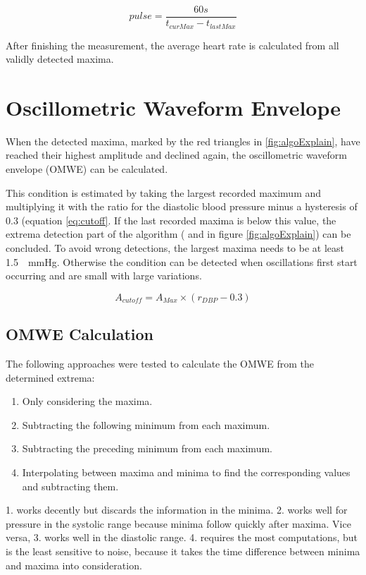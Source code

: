 \begin{equation}
\label{eq:HR}
pulse=\frac{60s}{t_{curMax} - t_{lastMax}}
\end{equation}

After finishing the measurement, the average heart rate is calculated from all validly detected maxima.


\section{Oscillometric Waveform Envelope}
When the detected maxima, marked by the red triangles in \ref{fig:algoExplain}, have reached their highest amplitude and declined again, the oscillometric waveform envelope (OMWE) can be calculated. 

This condition is estimated by taking the largest recorded maximum and multiplying it with the ratio for the diastolic blood pressure minus a hysteresis of $0.3$ (equation \ref{eq:cutoff}. If the last recorded maxima is below this value, the extrema detection part of the algorithm ( and  in figure \ref{fig:algoExplain}) can be concluded. To avoid wrong detections, the largest maxima needs to be at least \SI{1.5}{\delta\mmHg}. Otherwise the condition can be detected when oscillations first start occurring and are small with large variations. 

\begin{equation}
\label{eq:cutoff}
A_{cutoff}=A_{Max}\times (r_{DBP} - 0.3)
\end{equation}

\subsection{OMWE Calculation}
The following approaches were tested to calculate the OMWE from the determined extrema:

\begin{enumerate}[noitemsep]
\item Only considering the maxima.
\item Subtracting the following minimum from each maximum.
\item Subtracting the preceding minimum from each maximum.
\item Interpolating between maxima and minima to find the corresponding values and subtracting them. 
\end{enumerate}

1. works decently but discards the information in the minima. 2. works well for pressure in the systolic range because minima follow quickly after maxima. Vice versa, 3. works well in the diastolic range. 4. requires the most computations, but is the least sensitive to noise, because it takes the time difference between minima and maxima into consideration. 

